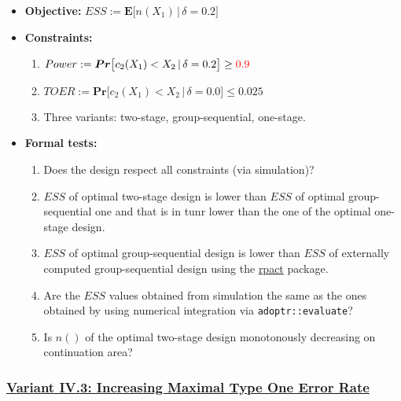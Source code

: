 \documentclass[]{book}
\providecommand{\tightlist}{%
  \setlength{\itemsep}{0pt}\setlength{\parskip}{0pt}}
\begin{document}
\begin{itemize}
\tightlist
\item
  \textbf{Objective:} \(ESS := \boldsymbol{E}\big[n(X_1)\,|\,\delta=0.2\big]\)
\item
  \textbf{Constraints:}

  \begin{enumerate}
  \def\labelenumi{\arabic{enumi}.}
  \tightlist
  \item
    \(Power := \boldsymbol{Pr}\big[c_2(X_1) < X_2\,|\,\delta=0.2\big] \geq \color{red}{0.9}\)
  \item
    \(TOER := \boldsymbol{Pr}\big[c_2(X_1) < X_2\,|\,\delta=0.0\big] \leq 0.025\)
  \item
    Three variants: two-stage, group-sequential, one-stage.
  \end{enumerate}
\item
  \textbf{Formal tests:}

  \begin{enumerate}
  \def\labelenumi{\arabic{enumi}.}
  \tightlist
  \item
    Does the design respect all constraints (via simulation)?
  \item
    \(ESS\) of optimal two-stage design is lower than \(ESS\) of optimal
    group-sequential one and that is in tunr lower than the one of the
    optimal one-stage design.
  \item
    \(ESS\) of optimal group-sequential design is lower than \(ESS\) of
    externally computed group-sequential design using the \href{https://rpact.org/}{rpact} package.
  \item
    Are the \(ESS\) values obtained from simulation the same as the ones
    obtained by using numerical integration via \texttt{adoptr::evaluate}?
  \item
    Is \(n()\) of the optimal two-stage design monotonously decreasing on
    continuation area?
  \end{enumerate}
\end{itemize}

\hypertarget{variant-iv.3-increasing-maximal-type-one-error-rate}{%
\subsubsection{\texorpdfstring{\protect\hyperlink{variantIV_3}{Variant IV.3: Increasing Maximal Type One Error Rate}}{Variant IV.3: Increasing Maximal Type One Error Rate}}\label{variant-iv.3-increasing-maximal-type-one-error-rate}}
\end{document}
